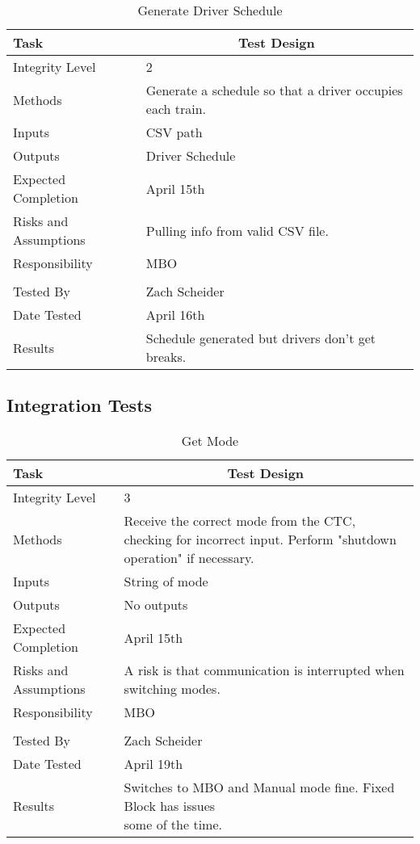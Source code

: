 \documentclass[]{article}
\begin{document}
\begin{table}[H]
	\centering
	\caption{Generate Driver Schedule}
	\begin{tabular}{|l|l|}
		\hline
		Task & \multicolumn{1}{c|}{Test Design} \\ \hline
		Integrity Level & 2 \\ \hline
		Methods & Generate a schedule so that a driver occupies each train. \\ \hline
		Inputs &  CSV path \\ \hline
		Outputs &  Driver Schedule\\ \hline
		Expected Completion & \parbox[t]{10cm}{April 15th}\\ \hline
		Risks and Assumptions & \parbox[t]{10cm}{Pulling info from valid CSV file.} \\ \hline
		Responsibility & MBO\\ \hline
		\\ \hline
		Tested By   &  Zach Scheider\\	\hline
		Date Tested & \parbox[t]{10cm}{April 16th}\\ \hline
		Results & Schedule generated but drivers don't get breaks.\\ \hline
	\end{tabular}
\end{table}

\subsection{Integration Tests}

\begin{table}[H]
	\centering
	\caption{Get Mode}
	\begin{tabular}{|l|l|}
		\hline
		Task & \multicolumn{1}{c|}{Test Design} \\ \hline
		Integrity Level & 3 \\ \hline
		Methods & \parbox[t]{10cm}{Receive the correct mode from the CTC, checking for incorrect input. Perform "shutdown operation" if necessary.}\\ \hline
		Inputs &  String of mode \\ \hline
		Outputs &  No outputs \\ \hline
		Expected Completion & \parbox[t]{10cm}{April 15th}\\ \hline
		Risks and Assumptions & \parbox[t]{10cm}{A risk is that communication is interrupted when switching modes.} \\ \hline
		Responsibility & MBO\\ \hline
			\\ \hline
		Tested By   &  Zach Scheider\\	\hline
		Date Tested & \parbox[t]{10cm}{April 19th}\\ \hline
		Results & \parbox[t]{10cm}{Switches to MBO and Manual mode fine. Fixed Block has issues \\some of the time.}\\ \hline
	\end{tabular}
\end{table}
\end{document}
